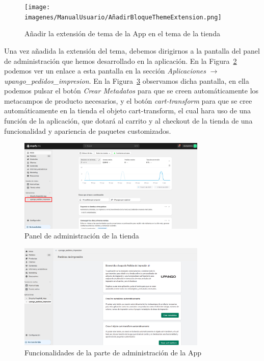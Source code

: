 \documentclass[12pt]{article}
\begin{document}
\begin{figure}[ht]
    \centering
    \texttt{[image: imagenes/ManualUsuario/AñadirBloqueThemeExtension.png]}
    \caption{\label{fig:ThemeAppExtension}Añadir la extensión de tema de la App en el tema de la tienda}
    \vspace{\fill}
\end{figure}

Una vez añadida la extensión del tema, debemos dirigirnos a la pantalla del panel de administración que hemos desarrollado en la aplicación. En la Figura~\ref{fig:PanelAdministracion} podemos
ver un enlace a esta pantalla en la sección \textit{Aplicaciones} $\rightarrow$  \textit{upango\_pedidos\_impresion}. En la Figura~\ref{fig:FuncionalidadAdministracion} observamos dicha pantalla, en ella podemos pulsar el botón \textit{Crear Metadatos} para que se creen 
automáticamente los metacampos de producto necesarios, y el botón \textit{cart-transform} para que se cree automáticamente en la tienda el objeto cart-transform, el cual hara uso de una función de la aplicación, que 
dotará al carrito y al checkout de la tienda de una funcionalidad y apariencia de paquetes customizados.

\begin{figure}[ht]
    \centering
    \includegraphics[width=0.8\textwidth]{imagenes/ManualUsuario/PaginaAdministracion.png}
    \caption{\label{fig:PanelAdministracion}Panel de administración de la tienda}
    \vspace{\fill}
\end{figure}

\begin{figure}[ht]
    \centering
    \includegraphics[width=0.8\textwidth]{imagenes/ManualUsuario/FuncionalidadPaginaAdministracion.png}
    \caption{\label{fig:FuncionalidadAdministracion}Funcionalidades de la parte de administración de la App}
    \vspace{\fill}
\end{figure}
\end{document}
